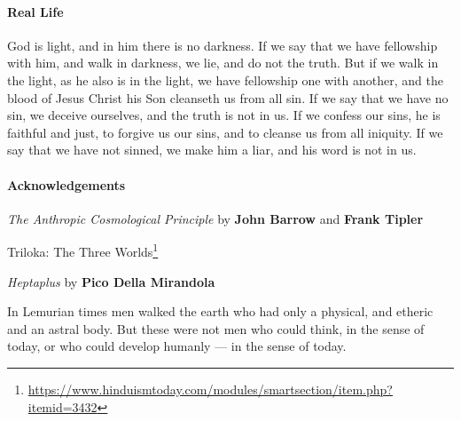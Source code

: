 \paragraph{Real Life}
\begin{quotex}
God is light, and in him there is no darkness. If we say that we have fellowship with him, and walk in darkness, we lie, and do not the truth. But if we walk in the light, as he also is in the light, we have fellowship one with another, and the blood of Jesus Christ his Son cleanseth us from all sin. If we say that we have no sin, we deceive ourselves, and the truth is not in us. If we confess our sins, he is faithful and just, to forgive us our sins, and to cleanse us from all iniquity. If we say that we have not sinned, we make him a liar, and his word is not in us. 

\end{quotex}

\hfill

\paragraph{Acknowledgements}
\emph{The Anthropic Cosmological Principle} by \textbf{John Barrow} and \textbf{Frank Tipler}

Triloka: The Three Worlds\footnote{\url{https://www.hinduismtoday.com/modules/smartsection/item.php?itemid=3432}}

\emph{Heptaplus }by \textbf{Pico Della Mirandola}

\begin{quotex}
In Lemurian times men walked the earth who had only a physical, and etheric and an astral body. But these were not men who could think, in the sense of today, or who could develop humanly — in the sense of today. 
\end{quotex}

